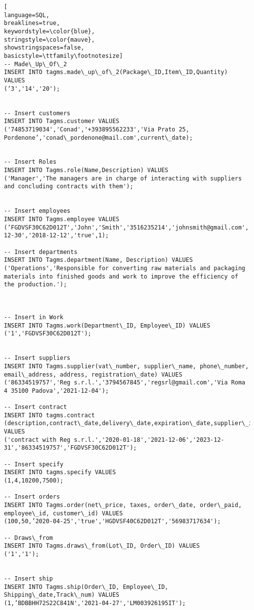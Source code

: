 \begin{lstlisting}[
language=SQL,
breaklines=true,
keywordstyle=\color{blue},
stringstyle=\color{mauve},
showstringspaces=false,
basicstyle=\ttfamily\footnotesize]
-- Made\_Up\_Of\_2
INSERT INTO tagms.made\_up\_of\_2(Package\_ID,Item\_ID,Quantity) VALUES
(‘3','14','20');									


-- Insert customers
INSERT INTO Tagms.customer VALUES
('74853719034','Conad','+393895562233','Via Prato 25, Pordenone’,'conad\_pordenone@mail.com',current\_date);


-- Insert Roles
INSERT INTO Tagms.role(Name,Description) VALUES
('Manager','The managers are in charge of interacting with suppliers and concluding contracts with them');


-- Insert employees
INSERT INTO Tagms.employee VALUES
(‘FGDVSF30C62D012T','John','Smith','3516235214','johnsmith@gmail.com','1995-12-30','2018-12-12','true',1);

-- Insert departments
INSERT INTO Tagms.department(Name, Description) VALUES
('Operations','Responsible for converting raw materials and packaging materials into finished goods and work to improve the efficiency of the production.');



-- Insert in Work
INSERT INTO Tagms.work(Department\_ID, Employee\_ID) VALUES
('1','FGDVSF30C62D012T');


-- Insert suppliers
INSERT INTO Tagms.supplier(vat\_number, supplier\_name, phone\_number, email\_address, address, registration\_date) VALUES
('86334519757','Reg s.r.l.','3794567845','regsrl@gmail.com','Via Roma 4 35100 Padova','2021-12-04');

-- Insert contract
INSERT INTO tagms.contract (description,contract\_date,delivery\_date,expiration\_date,supplier\_id,employee\_id) VALUES
('contract with Reg s.r.l.','2020-01-18','2021-12-06','2023-12-31','86334519757','FGDVSF30C62D012T');

-- Insert specify
INSERT INTO tagms.specify VALUES
(1,4,10200,7500);

-- Insert orders
INSERT INTO Tagms.order(net\_price, taxes, order\_date, order\_paid, employee\_id, customer\_id) VALUES
(100,50,’2020-04-25','true','HGDVSF40C62D012T','56983717634');

-- Draws\_from
INSERT INTO Tagms.draws\_from(Lot\_ID, Order\_ID) VALUES
('1','1');


-- Insert ship
INSERT INTO Tagms.ship(Order\_ID, Employee\_ID, Shipping\_date,Track\_num) VALUES
(1,’BDBBHH72S22C841N','2021-04-27','LM003926195IT');

\end{lstlisting}